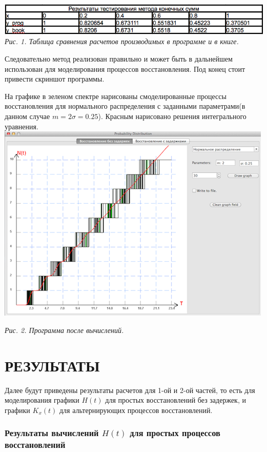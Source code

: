 \includegraphics{Log.png} 
\textit{Рис. 1. Таблица сравнения расчетов производимых в программе и в книге.}

Следовательно метод реализован правильно и может быть в дальнейшем использован  для моделирования процессов восстановления. Под конец стоит привести скриншот программы.

На графике в зеленом спектре нарисованы смоделированные процессы восстановления для нормального распределения с заданными параметрами(в данном случае $m = 2 \sigma = 0.25$). Красным нарисовано решения интегрального уравнения.
\includegraphics*{SampleProgramm.png} 

\textit{Рис. 2. Программа после вычислений.}

\chapter*{РЕЗУЛЬТАТЫ}

Далее будут приведены результаты расчетов для 1-ой и 2-ой частей, то есть для моделирования графики $H(t)$ для простых восстановлений без задержек, и графики $K_x(t)$ для альтернирующих процессов восстановлений.

\begin{center}
\item\subsection{Результаты вычислений $H(t)$ для простых процессов восстановлений}
\end{center}

